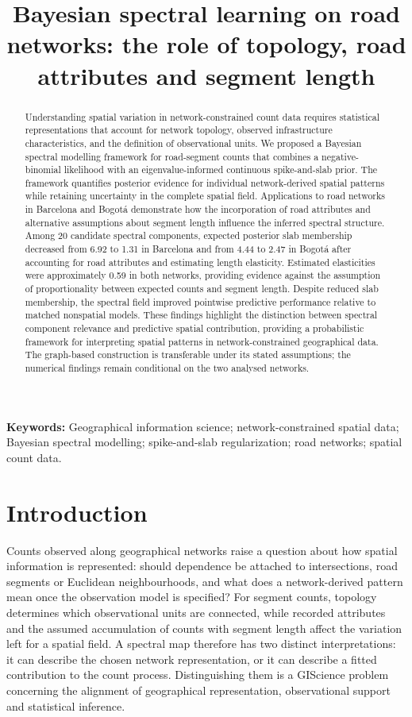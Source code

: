\documentclass[11pt]{article}
\title{Bayesian spectral learning on road networks:	the role of topology, road attributes and segment length}
\author{}
\date{}
\begin{document}
\maketitle
\begin{abstract}
	Understanding spatial variation in network-constrained count data 
	requires statistical representations that account for network 
	topology, observed infrastructure characteristics, and the 
	definition of observational units. We proposed a Bayesian spectral 
	modelling framework for road-segment counts that combines a 
	negative-binomial likelihood with an eigenvalue-informed 
	continuous spike-and-slab prior. The framework quantifies 
	posterior evidence for individual network-derived spatial 
	patterns while retaining uncertainty in the complete spatial 
	field. Applications to road networks in Barcelona and Bogotá 
	demonstrate how the incorporation of road attributes and 
	alternative assumptions about segment length influence the 
	inferred spectral structure. Among 20 candidate spectral 
	components, expected posterior slab membership decreased from 
	6.92 to 1.31 in Barcelona and from 4.44 to 2.47 in Bogotá after 
	accounting for road attributes and estimating length elasticity. 
	Estimated elasticities were approximately 0.59 in both networks, 
	providing evidence against the assumption of proportionality 
	between expected counts and segment length. Despite reduced 
	slab membership, the spectral field improved pointwise 
	predictive performance relative to matched nonspatial models. 
	These findings highlight the distinction between spectral 
	component relevance and predictive spatial contribution, 
	providing a probabilistic framework for interpreting spatial 
	patterns in network-constrained geographical data. The graph-based 
	construction is transferable under its stated assumptions; the numerical 
	findings remain conditional on the two analysed networks.
\end{abstract}
\noindent\textbf{Keywords:}
Geographical information science;
network-constrained spatial data;
Bayesian spectral modelling;
spike-and-slab regularization;
road networks;
spatial count data.

\section{Introduction}
Counts observed along geographical networks raise a question about how spatial information is represented: should dependence be attached to intersections, road segments or Euclidean neighbourhoods, and what does a network-derived pattern mean once the observation model is specified? For segment counts, topology determines which observational units are connected, while recorded attributes and the assumed accumulation of counts with segment length affect the variation left for a spatial field. A spectral map therefore has two distinct interpretations: it can describe the chosen network representation, or it can describe a fitted contribution to the count process. Distinguishing them is a GIScience problem concerning the alignment of geographical representation, observational support and statistical inference.
\end{document}
